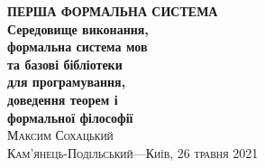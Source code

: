 \frontmatter
\thispagestyle{empty}
\mbox{}\vspace{1in}
\noindent
\begin{flushright}
\vspace{0.5cm}
\textbf{\Huge ПЕРША ФОРМАЛЬНА СИСТЕМА} \\
\vspace{0.5cm}
\textbf{\huge Середовище виконання, \\
        \huge формальна система мов \\
        \huge та базові бібліотеки \\
        \huge для програмування, \\
        \huge доведення теорем і \\
        \huge формальної філософії \\
}
\vspace{1em}
\vspace{6cm}
\hfill{\Large\scshape{}Максим Сохацький}
\\
\vspace{0.3cm}
\hfill{\scshape{}Кам'янець-Подільський---Київ, 26 травня 2021}
\end{flushright}
\cleartorecto
\tableofcontents*
\mainmatter
